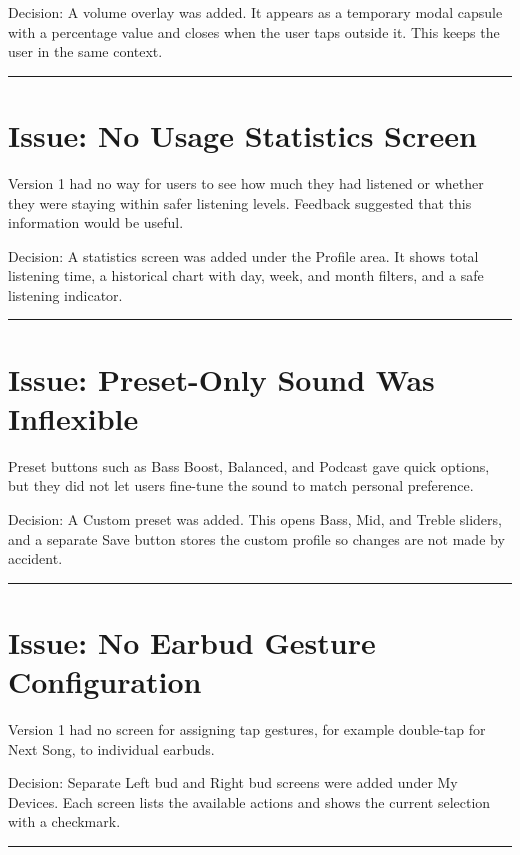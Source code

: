 \documentclass[12pt, a4paper]{report}
\newenvironment{highlight}{%
  \par\vspace{6pt}%
  \noindent%
  \begin{lrbox}{\hlbox}%
    \begin{minipage}{\dimexpr\linewidth-14pt\relax}%
      \vspace{6pt}\small%
}{%
      \vspace{6pt}%
    \end{minipage}%
  \end{lrbox}%
  \noindent\colorbox{lightgray}{%
    \hspace{2pt}%
    \textcolor{accentblue}{\rule[-0.2\baselineskip]{2pt}{\dimexpr\ht\hlbox+\dp\hlbox\relax}}%
    \hspace{8pt}\usebox{\hlbox}\hspace{2pt}%
  }%
  \par\vspace{6pt}%
}
\begin{document}
\begin{highlight}
Decision: A volume overlay was added. It appears as a temporary modal capsule with a
percentage value and closes when the user taps outside it. This keeps the user in
the same context.
\end{highlight}

\section{Issue: No Usage Statistics Screen}

Version 1 had no way for users to see how much they had listened or whether they
were staying within safer listening levels. Feedback suggested that this information
would be useful.

\begin{highlight}
Decision: A statistics screen was added under the Profile area. It shows total
listening time, a historical chart with day, week, and month filters, and a safe
listening indicator.
\end{highlight}

\section{Issue: Preset-Only Sound Was Inflexible}

Preset buttons such as Bass Boost, Balanced, and Podcast gave quick options, but
they did not let users fine-tune the sound to match personal preference.

\begin{highlight}
Decision: A Custom preset was added. This opens Bass, Mid, and Treble sliders, and
a separate Save button stores the custom profile so changes are not made by accident.
\end{highlight}

\section{Issue: No Earbud Gesture Configuration}

Version 1 had no screen for assigning tap gestures, for example double-tap for
Next Song, to individual earbuds.

\begin{highlight}
Decision: Separate Left bud and Right bud screens were added under My Devices. Each
screen lists the available actions and shows the current selection with a checkmark.
\end{highlight}
\end{document}
